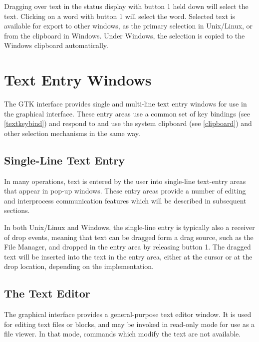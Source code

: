 Dragging over text in the status display with button 1 held down will
select the text.  Clicking on a word with button 1 will select the
word.  Selected text is available for export to other windows, as the
primary selection in Unix/Linux, or from the clipboard in Windows. 
Under Windows, the selection is copied to the Windows clipboard
automatically.


\section{Text Entry Windows}

The GTK interface provides single and multi-line text entry windows
for use in the graphical interface.  These entry areas use a common
set of key bindings (see \ref{textkeybind}) and respond to and use the
system clipboard (see \ref{clipboard}) and other selection mechanisms
in the same way.


\subsection{Single-Line Text Entry}

In many operations, text is entered by the user into single-line
text-entry areas that appear in pop-up windows.  These entry areas
provide a number of editing and interprocess communication features
which will be described in subsequent sections.

In both Unix/Linux and Windows, the single-line entry is typically
also a receiver of drop events, meaning that text can be dragged form
a drag source, such as the {\cb File Manager}, and dropped in the
entry area by releasing button 1.  The dragged text will be inserted
into the text in the entry area, either at the cursor or at the drop
location, depending on the implementation.


\subsection{The Text Editor}
\label{textedit}

The graphical interface provides a general-purpose text editor window. 
It is used for editing text files or blocks, and may be invoked in
read-only mode for use as a file viewer.  In that mode, commands which
modify the text are not available.

